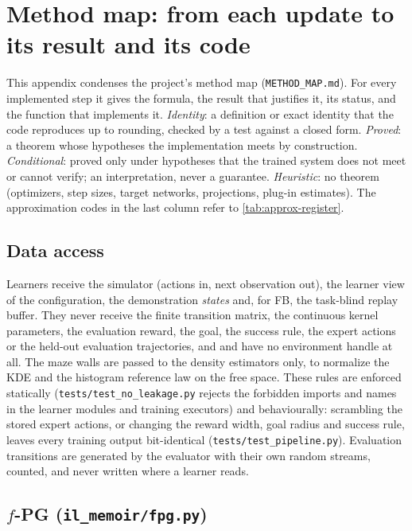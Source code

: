 \section{Method map: from each update to its result and its code}\label{app:methodmap}

This appendix condenses the project's method map (\nolinkurl{METHOD_MAP.md}).
For every implemented step it gives the formula, the result that justifies it, its status, and the function that implements it.
\emph{Identity}: a definition or exact identity that the code reproduces up to rounding, checked by a test against a closed form.
\emph{Proved}: a theorem whose hypotheses the implementation meets by construction.
\emph{Conditional}: proved only under hypotheses that the trained system does not meet or cannot verify; an interpretation, never a guarantee.
\emph{Heuristic}: no theorem (optimizers, step sizes, target networks, projections, plug-in estimates).
The approximation codes in the last column refer to \cref{tab:approx-register}.

\subsection{Data access}

Learners receive the simulator (actions in, next observation out), the learner view of the configuration, the demonstration \emph{states} and, for FB, the task-blind replay buffer.
They never receive the finite transition matrix, the continuous kernel parameters, the evaluation reward, the goal, the success rule, the expert actions or the held-out evaluation trajectories, and \ERFB{} and \DMFB{} have no environment handle at all.
The maze walls are passed to the density estimators only, to normalize the KDE and the histogram reference law on the free space.
These rules are enforced statically (\nolinkurl{tests/test_no_leakage.py} rejects the forbidden imports and names in the learner modules and training executors) and behaviourally: scrambling the stored expert actions, or changing the reward width, goal radius and success rule, leaves every training output bit-identical (\nolinkurl{tests/test_pipeline.py}).
Evaluation transitions are generated by the evaluator with their own random streams, counted, and never written where a learner reads.

\subsection{\texorpdfstring{$f$}{f}-PG (\texttt{il\_memoir/fpg.py})}

